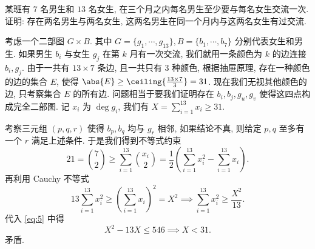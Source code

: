 \begin{prob}
\label{prob:prob-15}
某班有 $7$ 名男生和 $13$ 名女生, 在三个月之内每名男生至少要与每名女生交流一次.
证明: 存在两名男生与两名女生, 这两名男生在同一个月内与这两名女生有过交流.
\end{prob}

\begin{soln}
考虑一个二部图 $G \times B$.
其中 $G = \{g_1, \cdots, g_{13}\}, B = \{b_1, \cdots, b_7\}$ 分别代表女生和男生.
如果男生 $b_i$ 与女生 $g_j$ 在第 $k$ 月有一次交流,
我们就用一条颜色为 $k$ 的边连接 $b_i, g_j$.
由于一共有 $13 \times 7$ 条边, 且一共只有 $3$ 种颜色,
根据抽屉原理, 存在一种颜色的边的集合 $E$, 使得
$\abs{E} \ge \ceiling{\frac{13 \times 7}{3}} = 31$.
现在我们无视其他颜色的边, 只考察集合 $E$ 的所有边.
问题相当于要我们证明存在 $b_i, b_j, g_u, g_v$
使得这四点构成完全二部图. 记 $x_i$ 为 $\deg g_i$, 我们有
$X = \sum_{i=1}^{13} x_i \ge 31$.

\bigskip

考察三元组 $(p, q, r)$ 使得 $b_p, b_q$ 均与 $g_r$ 相邻,
如果结论不真, 则给定 $p, q$ 至多有一个 $r$ 满足上述条件.
于是我们得到不等式约束
\begin{equation}
\label{eq:5}
21 = \binom{7}{2} \ge \sum_{i=1}^{13} \binom{x_i}{2}
   = \frac{1}{2}\left(\sum_{i=1}^{13} x_i^2 - \sum_{i=1}^{13} x_i\right).
\end{equation}
再利用 Cauchy 不等式
\[
13\sum_{i=1}^{13}x_i^2 \ge \left(\sum_{i=1}^{13} x_i\right)^2 = X^2
\implies \sum_{i=1}^{13}x_i^2 \ge \frac{X^2}{13}.
\]
代入 \cref{eq:5} 中得
\[
X^2 - 13X \le 546 \implies X < 31.
\]
矛盾.
\end{soln}

